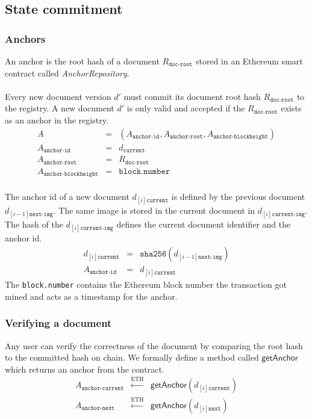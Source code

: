 \subsection{State commitment}

\subsubsection{Anchors}
An anchor is the root hash of a document $R_{\texttt{doc-root}}$ stored in an Ethereum smart contract called \textit{AnchorRepository}. 
\\\\
Every new document version $d'$ must commit its  document root hash $R_{\texttt{doc-root}}$ to the registry. A new document $d'$ is only valid and accepted if the $R_{\texttt{doc-root}}$ exists as an anchor in the registry.\\
\begin{eqnarray}
A &=& (A_{\texttt{anchor-id}}, A_{\texttt{anchor-root}}, A_{\texttt{anchor-blockheight}})\\
A_{\texttt{anchor-id}} & = & d_{\texttt{current}} \\
A_{\texttt{anchor-root}} & = & R_{\texttt{doc-root}} \\
A_{\texttt{anchor-blockheight}} & = & \texttt{block.number}
\end{eqnarray}
\\
The anchor id of a new document $d_{[i]{\texttt{current}}}$ is defined by the previous document $d_{[i-1]\texttt{next-img}}$. The same image is stored in the current 
document in $d_{[i]\texttt{current-img}}$. The hash of the $d_{[i]\texttt{current-img}}$ defines the current document identifier and the anchor id.
\begin{eqnarray}
d_{[i]\texttt{current}}& = & \mathtt{sha256}(d_{[i-1]\texttt{next-img}})\\
A_{\texttt{anchor-id}}& = & d_{[i]\texttt{current}}
\end{eqnarray}
The \texttt{block.number} contains the Ethereum block number the transaction got mined and acts as a timestamp for the anchor.
\subsubsection{Verifying a document}
Any user can verify the correctness of the document by comparing the root hash to the committed hash on chain. We formally define a method called $\mathsf{getAnchor}$ which returns an anchor from the contract.
\begin{eqnarray}
A_{\texttt{anchor-current}} & \xleftarrow[]{\text{ETH}}& \mathsf{getAnchor}(d_{[i]{\texttt{current}}}) \\
A_{\texttt{anchor-next}} & \xleftarrow[]{\text{ETH}} & \mathsf{getAnchor}(d_{[i]{\texttt{next}}}) \\
\end{eqnarray}

